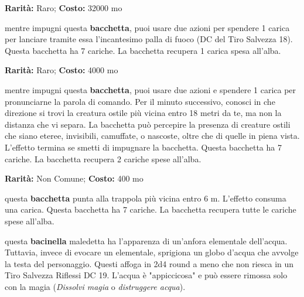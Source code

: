 \begin{multicols}{2}





\textbf{Rarità:} Raro; \textbf{Costo:} 32000 mo

mentre impugni questa \textbf{bacchetta}, puoi usare due azioni per spendere 1 carica per lanciare tramite essa l'incantesimo palla di fuoco (DC del Tiro Salvezza 18). Questa bacchetta ha 7 cariche. La bacchetta recupera 1 carica spesa all'alba.


\textbf{Rarità:} Raro; \textbf{Costo:} 4000 mo

mentre impugni questa \textbf{bacchetta}, puoi usare due azioni e spendere 1 carica per pronunciarne la parola di comando. Per il minuto successivo, conosci in che direzione si trovi la creatura ostile più vicina entro 18 metri da te, ma non la distanza che vi separa. La bacchetta può percepire la presenza di creature ostili che siano eteree, invisibili, camuffate, o nascoste, oltre che di quelle in piena vista. L'effetto termina se smetti di impugnare la bacchetta. Questa bacchetta ha 7 cariche. La bacchetta recupera 2 cariche spese all'alba.


\textbf{Rarità:} Non Comune; \textbf{Costo:} 400 mo

questa \textbf{bacchetta} punta alla trappola più vicina entro 6 m. L'effetto consuma una carica. Questa bacchetta ha 7 cariche. La bacchetta recupera tutte le cariche spese all'alba.


questa \textbf{bacinella} maledetta ha l'apparenza di un'anfora elementale dell'acqua. Tuttavia, invece di evocare un elementale, sprigiona un globo d'acqua che avvolge la testa del personaggio. Questi affoga in 2d4 round a meno che non riesca in un Tiro Salvezza Riflessi DC 19. L'acqua è "appiccicosa" e può essere rimossa solo con la magia (\emph{Dissolvi magia} o \emph{distruggere acqua}).



\end{multicols}
